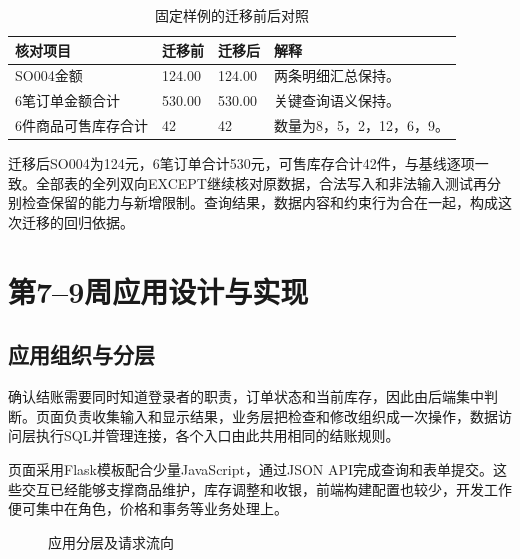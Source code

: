 \documentclass{SYSUReport}
\begin{document}
\begin{table}[H]\centering\small
\begin{tabularx}{\textwidth}{P{2.4cm}P{2.0cm}P{2.0cm}Y}
\toprule 核对项目 & 迁移前 & 迁移后 & 解释 \\
\midrule
SO004金额 & 124.00 & 124.00 & 两条明细汇总保持。 \\
6笔订单金额合计 & 530.00 & 530.00 & 关键查询语义保持。 \\
6件商品可售库存合计 & 42 & 42 & 数量为8，5，2，12，6，9。 \\
\bottomrule
\end{tabularx}\caption{固定样例的迁移前后对照}
\end{table}

迁移后SO004为124元，6笔订单合计530元，可售库存合计42件，与基线逐项一致。全部表的全列双向EXCEPT继续核对原数据，合法写入和非法输入测试再分别检查保留的能力与新增限制。查询结果，数据内容和约束行为合在一起，构成这次迁移的回归依据。

\clearpage
\section{第7--9周应用设计与实现}
\subsection{应用组织与分层}
确认结账需要同时知道登录者的职责，订单状态和当前库存，因此由后端集中判断。页面负责收集输入和显示结果，业务层把检查和修改组织成一次操作，数据访问层执行SQL并管理连接，各个入口由此共用相同的结账规则。

页面采用Flask模板配合少量JavaScript，通过JSON API完成查询和表单提交。这些交互已经能够支撑商品维护，库存调整和收银，前端构建配置也较少，开发工作便可集中在角色，价格和事务等业务处理上。

\begin{figure}[H]\centering
{}\caption{应用分层及请求流向}
\end{figure}
\end{document}
